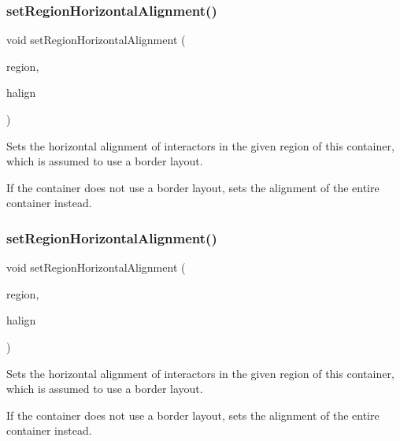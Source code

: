 \subsubsection{\texorpdfstring{set\+Region\+Horizontal\+Alignment()}{setRegionHorizontalAlignment()}\hspace{0.1cm}{\footnotesize\ttfamily [1/2]}}
{\footnotesize\ttfamily void set\+Region\+Horizontal\+Alignment (\begin{DoxyParamCaption}\item[{\mbox{\hyperlink{classGContainer_a81a01a86de31071a92e6cce0bab9bc4b}{Region}}}]{region,  }\item[{Horizontal\+Alignment}]{halign }\end{DoxyParamCaption})\hspace{0.3cm}{\ttfamily [virtual]}}



Sets the horizontal alignment of interactors in the given region of this container, which is assumed to use a border layout. 

If the container does not use a border layout, sets the alignment of the entire container instead. \mbox{\label{classGContainer_aefb97090ff4e149f8a0cce9efee3c451}} 
\subsubsection{\texorpdfstring{set\+Region\+Horizontal\+Alignment()}{setRegionHorizontalAlignment()}\hspace{0.1cm}{\footnotesize\ttfamily [2/2]}}
{\footnotesize\ttfamily void set\+Region\+Horizontal\+Alignment (\begin{DoxyParamCaption}\item[{const std\+::string \&}]{region,  }\item[{const std\+::string \&}]{halign }\end{DoxyParamCaption})\hspace{0.3cm}{\ttfamily [virtual]}}



Sets the horizontal alignment of interactors in the given region of this container, which is assumed to use a border layout. 

If the container does not use a border layout, sets the alignment of the entire container instead. \mbox{\label{classGContainer_afbe22d897ce8ef25db52cbc3d456aa0a}} 

